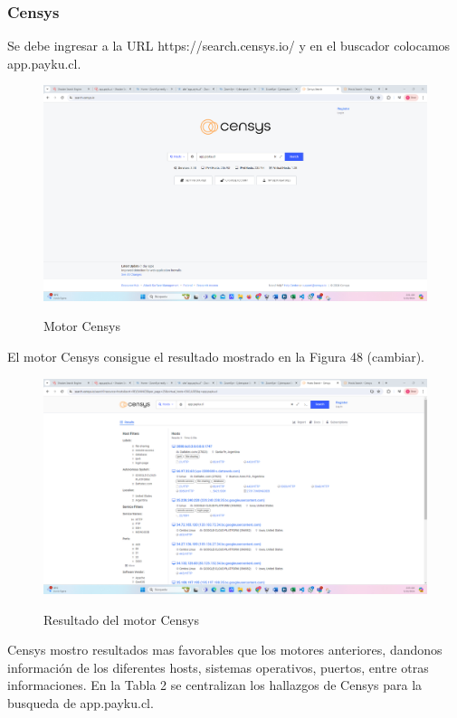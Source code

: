 \documentclass[stu, 11pt, letterpaper, donotrepeattitle, floatsintext, natbib]{apa7}
\begin{document}
\subsubsection{Censys}

Se debe ingresar a la URL https://search.censys.io/ y en el buscador colocamos app.payku.cl.

\begin{figure}[H]
    \centering
    \caption{Motor Censys}
    \includegraphics[width=0.75\linewidth]{ac66.png} %
    \label{fig:OverallEffect}
\end{figure}

El motor Censys consigue el resultado mostrado en la Figura 48 (cambiar).

\begin{figure}[H]
    \centering
    \caption{Resultado del motor Censys}
    \includegraphics[width=0.75\linewidth]{ac67.png} %
    \label{fig:OverallEffect}
\end{figure}

Censys mostro resultados mas favorables que los motores anteriores, dandonos información de los diferentes hosts, sistemas operativos, puertos, entre otras informaciones. En la Tabla 2 se centralizan los hallazgos de Censys para la busqueda de app.payku.cl.
\end{document}
